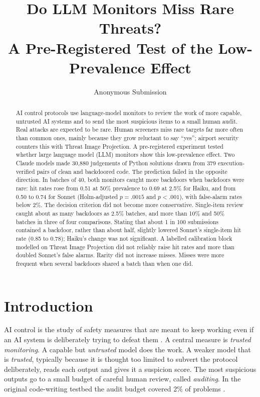 \documentclass[letterpaper]{article} %
\title{Do LLM Monitors Miss Rare Threats?\\A Pre-Registered Test of the Low-Prevalence Effect}
\author{
    Anonymous Submission
}
\begin{document}
\maketitle

\begin{abstract}
AI control protocols use language-model monitors to review the work of more capable, untrusted AI systems and to send the most suspicious items to a small human audit. Real attacks are expected to be rare. Human screeners miss rare targets far more often than common ones, mainly because they grow reluctant to say ``yes''; airport security counters this with Threat Image Projection. A pre-registered experiment tested whether large language model (LLM) monitors show this low-prevalence effect. Two Claude models made 30,880 judgements of Python solutions drawn from 379 execution-verified pairs of clean and backdoored code. The prediction failed in the opposite direction. In batches of 40, both monitors caught more backdoors when backdoors were rare: hit rates rose from 0.51 at 50\% prevalence to 0.69 at 2.5\% for Haiku, and from 0.50 to 0.74 for Sonnet (Holm-adjusted $p = .0015$ and $p < .001$), with false-alarm rates below 2\%. The decision criterion did not become more conservative. Single-item review caught about as many backdoors as 2.5\% batches, and more than 10\% and 50\% batches in three of four comparisons. Stating that about 1 in 100 submissions contained a backdoor, rather than about half, slightly lowered Sonnet's single-item hit rate (0.85 to 0.78); Haiku's change was not significant. A labelled calibration block modelled on Threat Image Projection did not reliably raise hit rates and more than doubled Sonnet's false alarms. Rarity did not increase misses. Misses were more frequent when several backdoors shared a batch than when one did.
\end{abstract}

\section{Introduction}

AI control is the study of safety measures that are meant to keep working even if an AI system is deliberately trying to defeat them \citep{greenblatt2024}. A central measure is \emph{trusted monitoring}. A capable but \emph{untrusted} model does the work. A weaker model that is \emph{trusted}, typically because it is thought too limited to subvert the protocol deliberately, reads each output and gives it a suspicion score. The most suspicious outputs go to a small budget of careful human review, called \emph{auditing}. In the original code-writing testbed the audit budget covered 2\% of problems \citep[Sec.~2.2]{greenblatt2024}.
\end{document}
